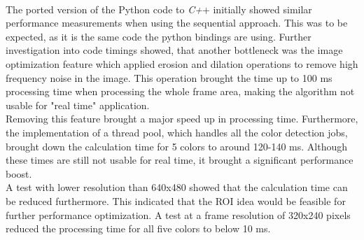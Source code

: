 \\The ported version of the Python code to\textit{ C+}+ initially showed similar performance measurements when using the sequential approach. This was to be expected, as it is the same code the python bindings are using. Further investigation into code timings showed, that another bottleneck was the image optimization feature which applied erosion and dilation operations to remove high frequency noise in the image. This operation brought the time up to 100 ms processing time when processing the whole frame area, making the algorithm  not usable for "real time" application. \\Removing this feature brought a major speed up in processing time. 
Furthermore, the implementation of a thread pool, which handles all the color detection jobs, brought down the calculation time for 5 colors to around 120-140 ms. Although these times are still not usable for real time, it brought a significant performance boost.\\
A test with lower resolution than 640x480 showed that the calculation time can be  reduced furthermore. This indicated that the ROI idea would be feasible for  further performance optimization. A test at a frame resolution of 320x240 pixels reduced the processing time for all five colors to below 10 ms.\\
